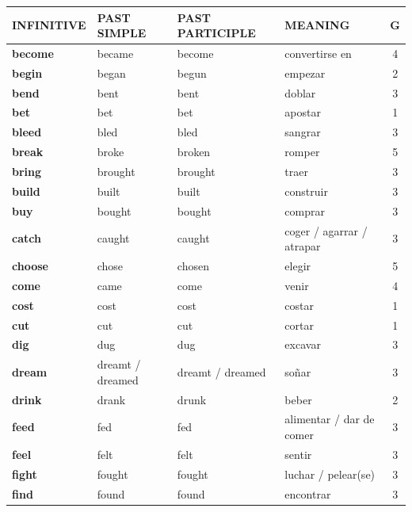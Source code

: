 \documentclass[11pt,a4paper]{article}
\begin{document}
\begin{longtable}{|>{\bfseries}p{2.6cm}|p{3.4cm}|p{3.6cm}|>{\raggedright\arraybackslash}p{6.0cm}|c|}
\hline
\rowcolor{black!75}\textbf{\color{white}INFINITIVE} & \textbf{\color{white}PAST SIMPLE} & \small\textbf{\color{white}PAST\,PARTICIPLE} & \textbf{\color{white}MEANING} & \textbf{\color{white}G}\\ \hline\endhead
\rowcolor{moradoC} become & became & become & convertirse en & 4\\ \hline
\rowcolor{naranjaC} begin & began & begun & empezar & 2\\ \hline
\rowcolor{verdeC} bend & bent & bent & doblar & 3\\ \hline
\rowcolor{amarilloC} bet & bet & bet & apostar & 1\\ \hline
\rowcolor{verdeC} bleed & bled & bled & sangrar & 3\\ \hline
\rowcolor{rojoC} break & broke & broken & romper & 5\\ \hline
\rowcolor{verdeC} bring & brought & brought & traer & 3\\ \hline
\rowcolor{verdeC} build & built & built & construir & 3\\ \hline
\rowcolor{verdeC} buy & bought & bought & comprar & 3\\ \hline
\rowcolor{verdeC} catch & caught & caught & coger / agarrar / atrapar & 3\\ \hline
\rowcolor{rojoC} choose & chose & chosen & elegir & 5\\ \hline
\rowcolor{moradoC} come & came & come & venir & 4\\ \hline
\rowcolor{amarilloC} cost & cost & cost & costar & 1\\ \hline
\rowcolor{amarilloC} cut & cut & cut & cortar & 1\\ \hline
\rowcolor{verdeC} dig & dug & dug & excavar & 3\\ \hline
\rowcolor{verdeC} dream & dreamt / dreamed & dreamt / dreamed & soñar & 3\\ \hline
\rowcolor{naranjaC} drink & drank & drunk & beber & 2\\ \hline
\rowcolor{verdeC} feed & fed & fed & alimentar / dar de comer & 3\\ \hline
\rowcolor{verdeC} feel & felt & felt & sentir & 3\\ \hline
\rowcolor{verdeC} fight & fought & fought & luchar / pelear(se) & 3\\ \hline
\rowcolor{verdeC} find & found & found & encontrar & 3\\ \hline

\end{longtable}
\end{document}
